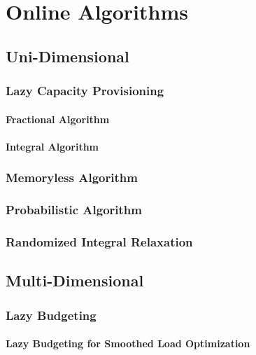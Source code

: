 
\chapter{Online Algorithms}\label{chapter:algorithms}

\section{Uni-Dimensional}

\subsection{Lazy Capacity Provisioning}

\subsubsection{Fractional Algorithm}

\subsubsection{Integral Algorithm}

\subsection{Memoryless Algorithm}

\subsection{Probabilistic Algorithm}

\subsection{Randomized Integral Relaxation}

\section{Multi-Dimensional}

\subsection{Lazy Budgeting}

\subsubsection{Lazy Budgeting for Smoothed Load Optimization}

